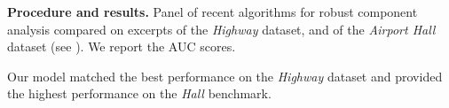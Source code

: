 \documentclass[landscape,a1paper,fontscale=0.42]{baposter}
\begin{document}
\begin{poster}
{ 
  \begin{multicols}{2}
  \textbf{Procedure and results. }
  Panel of recent algorithms for robust component analysis compared on excerpts of the \textit{Highway} dataset, and of the \textit{Airport Hall} dataset (see \cite{Bahri2017}). We report the AUC scores. 
  
  \vspace{1em}
  Our model matched the best performance on the \textit{Highway} dataset and provided the highest performance on the \textit{Hall} benchmark.

  \hspace{2em}
  \end{multicols}
   }
%

\end{poster}
\end{document}
